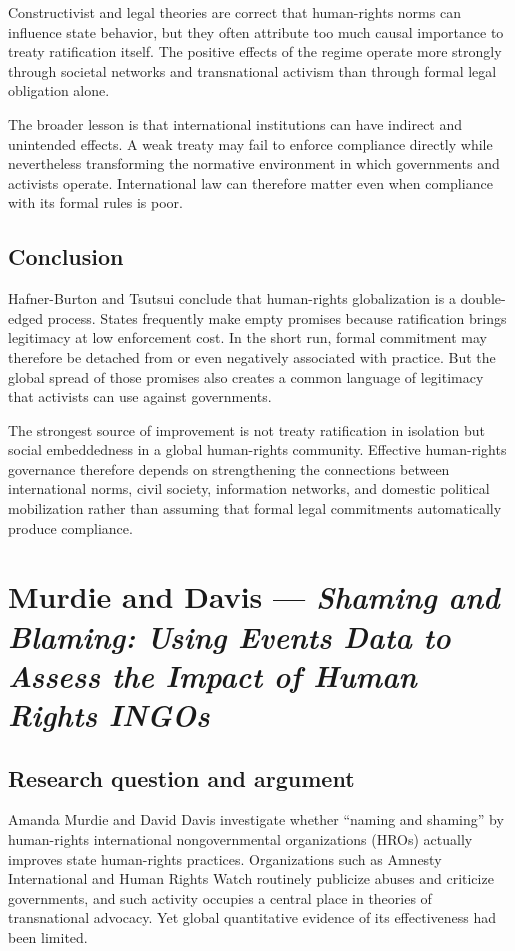 Constructivist and legal theories are correct that human-rights norms can influence state behavior, but they often attribute too much causal importance to treaty ratification itself. The positive effects of the regime operate more strongly through societal networks and transnational activism than through formal legal obligation alone.

The broader lesson is that international institutions can have indirect and unintended effects. A weak treaty may fail to enforce compliance directly while nevertheless transforming the normative environment in which governments and activists operate. International law can therefore matter even when compliance with its formal rules is poor.

\subsection{Conclusion}

Hafner-Burton and Tsutsui conclude that human-rights globalization is a double-edged process. States frequently make empty promises because ratification brings legitimacy at low enforcement cost. In the short run, formal commitment may therefore be detached from or even negatively associated with practice. But the global spread of those promises also creates a common language of legitimacy that activists can use against governments.

The strongest source of improvement is not treaty ratification in isolation but social embeddedness in a global human-rights community. Effective human-rights governance therefore depends on strengthening the connections between international norms, civil society, information networks, and domestic political mobilization rather than assuming that formal legal commitments automatically produce compliance.


\clearpage
\section{Murdie and Davis --- \textit{Shaming and Blaming: Using Events Data to Assess the Impact of Human Rights INGOs}}

\subsection{Research question and argument}

Amanda Murdie and David Davis investigate whether ``naming and shaming'' by human-rights international nongovernmental organizations (HROs) actually improves state human-rights practices. Organizations such as Amnesty International and Human Rights Watch routinely publicize abuses and criticize governments, and such activity occupies a central place in theories of transnational advocacy. Yet global quantitative evidence of its effectiveness had been limited.

